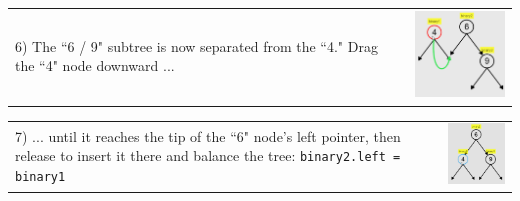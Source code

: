 \noindent \begin{tabular}{m{4.6cm} m{3.4cm}}

6) The ``6 / 9" subtree is now separated from the ``4." Drag the ``4"
node downward ...

& \includegraphics[width=3.4cm]{img/examples/bst-6.png}
\end{tabular}

\noindent \begin{tabular}{m{4.6cm} m{3.4cm}}

7) ... until it reaches the tip of the ``6" node's left pointer, then
release to insert it there and balance the tree: \texttt{binary2.left =
binary1}

& \includegraphics[width=3.4cm]{img/examples/bst-7.png}
\end{tabular}

